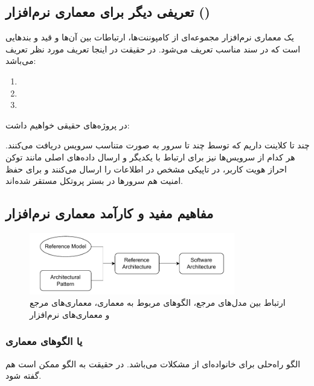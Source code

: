 \subsection{تعریفی دیگر برای معماری نرم‌افزار ()}

یک معماری نرم‌افزار مجموعه‌ای از کامپوننت‌ها، ارتباطات بین آن‌ها و قید و
بند‌هایی است که در سند مناسب تعریف می‌شود. در حقیقت در اینجا تعریف مورد نظر
تعریف  می‌باشد:

\begin{enumerate}
    \item {}
    \item {}
    \item {}
\end{enumerate}

در پروژه‌های حقیقی خواهیم داشت:

چند تا کلاینت داریم که توسط چند تا سرور به صورت متناسب سرویس دریافت می‌کنند. هر
کدام از سرویس‌ها نیز برای ارتباط با یکدیگر و ارسال داده‌های اصلی مانند توکن
احراز هویت کاربر، در تاپیکی مشخص در  اطلاعات را ارسال می‌کنند و برای
حفظ امنیت هم سرور‌ها در بستر پروتکل  مستقر شده‌اند.

\subsection{مفاهیم مفید و کارآمد معماری نرم‌افزار}

\begin{figure}[H]
    \centering
    \includegraphics[width=0.8\textwidth]{images/box_and_arrow_sa.drawio.pdf}
    \caption{ارتباط بین مدل‌های مرجع، الگو‌های مربوط به معماری، معماری‌های مرجع
    و معماری‌های نرم‌افزار}
    \label{fig:saStages}
\end{figure}

\subsubsection{ یا الگو‌های معماری}

الگو راه‌حلی برای خانواده‌ای از مشکلات می‌باشد. در حقیقت به الگو ممکن است
 هم گفته شود.

